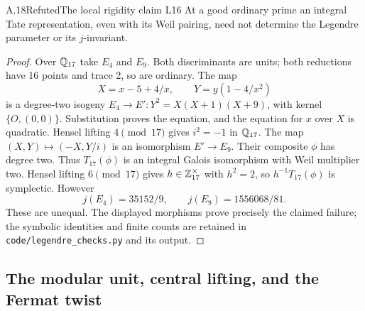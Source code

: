 \begin{statement}{A.18}{Refuted}{The local rigidity claim L16}
At a good ordinary prime an integral Tate representation, even with
its Weil pairing, need not determine the Legendre parameter or its
$j$-invariant.
\end{statement}
\begin{proof}
Over $\mathbb Q_{17}$ take $E_4$ and $E_9$.  Both discriminants are units;
both reductions have 16 points and trace 2, so are ordinary.  The map
\[
 X=x-5+4/x,\qquad Y=y(1-4/x^2)
\]
is a degree-two isogeny
$E_4\to E':Y^2=X(X+1)(X+9)$, with kernel $\{O,(0,0)\}$.
Substitution proves the equation, and the equation for $x$ over $X$
is quadratic.  Hensel lifting $4\pmod {17}$ gives $i^2=-1$ in
$\mathbb Q_{17}$.  The map $(X,Y)\mapsto(-X,Y/i)$ is an isomorphism
$E'\to E_9$.  Their composite $\phi$ has degree two.
Thus $T_{17}(\phi)$ is an integral Galois isomorphism with Weil
multiplier two.  Hensel lifting $6\pmod {17}$ gives
$h\in\mathbb Z_{17}^\times$ with $h^2=2$, so
$h^{-1}T_{17}(\phi)$ is symplectic.  However
\[
                j(E_4)=35152/9,\qquad j(E_9)=1556068/81.
\]
These are unequal.  The displayed morphisms prove precisely the claimed
failure; the symbolic identities and finite counts are retained in
\texttt{code/legendre\_checks.py} and its output.
\end{proof}

\subsection{The modular unit, central lifting, and the Fermat twist}

